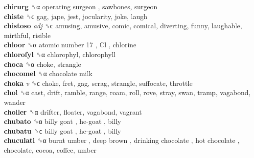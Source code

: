 \textbf{chirurg} ␝α   operating surgeon , sawbones, surgeon  \\
\textbf{chiste} ␝ϲ  gag, jape, jest, jocularity, joke, laugh  \\
\textbf{chistoso} \emph{adj}  ␝ϲ  amusing, amusive, comic, comical, diverting, funny, laughable, mirthful, risible  \\
\textbf{chloor} ␝α   atomic number 17 ,  Cl , chlorine  \\
\textbf{chlorofyl} ␝α  chlorophyl, chlorophyll  \\
\textbf{choca} ␝α  choke, strangle  \\
\textbf{chocomel} ␝α   chocolate milk   \\
\textbf{choka} \emph{v}  ␝ϲ  choke, fret, gag, scrag, strangle, suffocate, throttle  \\
\textbf{chol} ␝α  cast, drift, ramble, range, roam, roll, rove, stray, swan, tramp, vagabond, wander  \\
\textbf{choller} ␝α  drifter, floater, vagabond, vagrant  \\
\textbf{chubato} ␝α   billy goat ,  he-goat , billy  \\
\textbf{chubatu} ␝ϲ   billy goat ,  he-goat , billy  \\
\textbf{chuculati} ␝α   burnt umber ,  deep brown ,  drinking chocolate ,  hot chocolate , chocolate, cocoa, coffee, umber  \\
